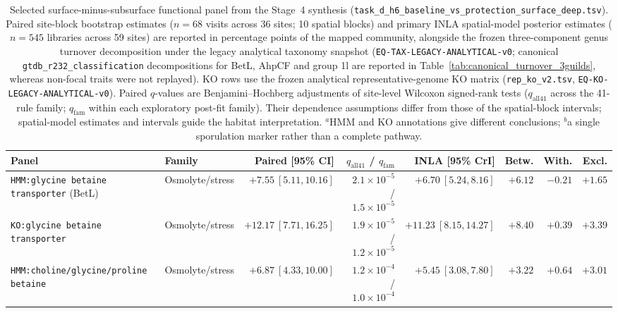 \begin{table}[htbp]\centering\scriptsize
\setlength{\tabcolsep}{1.5pt}
\caption{Selected surface-minus-subsurface functional panel from the Stage~4 synthesis (\texttt{task\_\allowbreak d\_\allowbreak h6\_\allowbreak baseline\_\allowbreak vs\_\allowbreak protection\_\allowbreak surface\_\allowbreak deep.tsv}). Paired site-block bootstrap estimates ($n=68$ visits across 36 sites; 10 spatial blocks) and primary INLA spatial-model posterior estimates ($n=545$ libraries across 59 sites) are reported in percentage points of the mapped community, alongside the frozen three-component genus turnover decomposition under the legacy analytical taxonomy snapshot (\texttt{EQ-\allowbreak TAX-\allowbreak LEGACY-\allowbreak ANALYTICAL-\allowbreak v0}; canonical \texttt{gtdb\_\allowbreak r232\_\allowbreak classification} decompositions for BetL, AhpCF and group 1l are reported in Table~\ref{tab:canonical_turnover_3guilds}, whereas non-focal traits were not replayed). KO rows use the frozen analytical representative-genome KO matrix (\texttt{rep\_\allowbreak ko\_\allowbreak v2.tsv}, \texttt{EQ-\allowbreak KO-\allowbreak LEGACY-\allowbreak ANALYTICAL-\allowbreak v0}). Paired $q$-values are Benjamini--Hochberg adjustments of site-level Wilcoxon signed-rank tests ($q_{\mathrm{all41}}$ across the 41-rule family; $q_{\mathrm{fam}}$ within each exploratory post-fit family). Their dependence assumptions differ from those of the spatial-block intervals; spatial-model estimates and intervals guide the habitat interpretation. $^a$HMM and KO annotations give different conclusions; $^b$a single sporulation marker rather than a complete pathway.}\label{tab:stage4_selected_panel}
\begin{tabular}{>{\raggedright\arraybackslash}p{2.9cm}lrrrrrr}\toprule
Panel & Family & Paired [95\% CI] & $q_{\mathrm{all41}}$ / $q_{\mathrm{fam}}$ & INLA [95\% CrI] & Betw. & With. & Excl.\\\midrule
\texttt{HMM:glycine betaine transporter} (BetL) & Osmolyte/stress & $+7.55\ [5.11,10.16]$ & $2.1\times 10^{-5}$ / $1.5\times 10^{-5}$ & $+6.70\ [5.24,8.16]$ & $+6.12$ & $-0.21$ & $+1.65$\\
\texttt{KO:glycine betaine transporter} & Osmolyte/stress & $+12.17\ [7.71,16.25]$ & $1.9\times 10^{-5}$ / $1.2\times 10^{-5}$ & $+11.23\ [8.15,14.27]$ & $+8.40$ & $+0.39$ & $+3.39$\\
\texttt{HMM:choline/\allowbreak glycine/\allowbreak proline betaine} & Osmolyte/stress & $+6.87\ [4.33,10.00]$ & $1.2\times 10^{-4}$ / $1.0\times 10^{-4}$ & $+5.45\ [3.08,7.80]$ & $+3.22$ & $+0.64$ & $+3.01$\\

\end{tabular}
\end{table}
